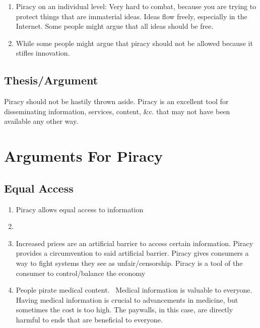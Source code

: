 \documentclass[onecolumn, 12pt]{article}
\begin{document}
\begin{enumerate}
  \item Piracy on an individual level: Very hard to combat, because you are
    trying to protect things that are immaterial ideas. Ideas flow freely,
    especially in the Internet. Some people might argue that all ideas should
    be free.

  \item While some people might argue that piracy should not be allowed because
    it stifles innovation.
\end{enumerate}

\subsection{Thesis/Argument}

Piracy should not be hastily thrown aside.
Piracy is an excellent tool for disseminating information, services, content,
\&c. that may not have been available any other way.

\section{Arguments For Piracy}

\subsection{Equal Access}

\begin{enumerate}
  \item Piracy allows equal access to information
  \item {}

  \item Increased prices are an artificial barrier to access certain
    information. Piracy provides a circumvention to said artificial barrier.
    Piracy gives consumers a way to fight systems they see as
    unfair/censorship. Piracy is a tool of the consumer to control/balance the
    economy~\cite{darnton:pirating-and-publishing, bohannon:everyone}

  \item People pirate medical content.~\cite{till:medical-literature}
    Medical information is valuable to everyone. Having medical information is
    crucial to advancements in medicine, but sometimes the cost is too high.
    The paywalls, in this case, are directly harmful to ends that are
    beneficial to everyone.
\end{enumerate}
\end{document}
